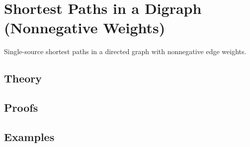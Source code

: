 
\section{Shortest Paths in a Digraph (Nonnegative Weights)}
\label{sec:2.2.10-shortest-paths-digraph}

\begin{ticket}
Single-source shortest paths in a directed graph with nonnegative edge weights.
\end{ticket}

\subsection*{Theory}

\subsection*{Proofs}

\subsection*{Examples}
